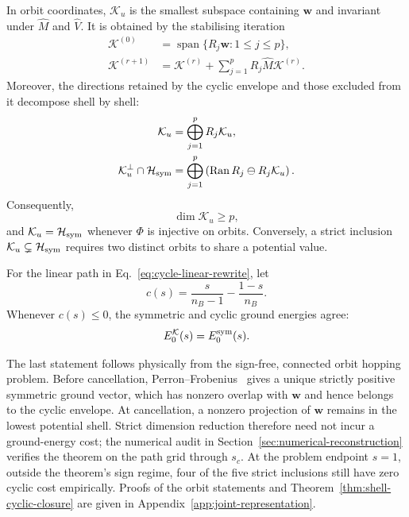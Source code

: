 \begin{theorem}
\label{thm:shell-cyclic-closure}
In orbit coordinates, $\mathcal K_u$ is the smallest subspace containing
$\boldsymbol w$ and invariant under $\widehat M$ and $\widehat V$.  It is obtained by
the stabilising iteration
\begin{align}
 \mathcal K^{(0)}&=\operatorname{span}\{R_j\boldsymbol w:1\leq j\leq p\},\\
 \mathcal K^{(r+1)}&=\mathcal K^{(r)}+
 \sum_{j=1}^pR_j\widehat M\mathcal K^{(r)}.
 \label{eq:shell-cyclic-iteration}
\end{align}
Moreover, the directions retained by the cyclic envelope and those excluded
from it decompose shell by shell:
\begin{align}
 \mathcal K_u&=\bigoplus_{j=1}^pR_j\mathcal K_u,\\
 \mathcal K_u^\perp\cap\mathcal H_{\rm sym}
 &=\bigoplus_{j=1}^p
 \left(\operatorname{Ran}R_j\ominus R_j\mathcal K_u\right).
 \label{eq:shell-complement-decomposition}
\end{align}
Consequently,
\begin{equation}
 \dim\mathcal K_u\geq p,
 \label{eq:shell-lower-bound}
\end{equation}
and $\mathcal K_u=\mathcal H_{\rm sym}$ whenever $\Phi$ is injective on
orbits.  Conversely, a strict inclusion
$\mathcal K_u\subsetneq\mathcal H_{\rm sym}$ requires two distinct orbits
to share a potential value.

For the linear path in Eq.~\eqref{eq:cycle-linear-rewrite}, let
\begin{equation}
 c(s)=\frac{s}{n_B-1}-\frac{1-s}{n_B}.
 \label{eq:hopping-coefficient}
\end{equation}
Whenever $c(s)\leq0$, the symmetric and cyclic ground energies agree:
\begin{equation}
 E_0^{\mathcal K}(s)=E_0^{\rm sym}(s).
 \label{eq:zero-cyclic-cost-before-cancellation}
\end{equation}
\end{theorem}

The last statement follows physically from the sign-free, connected orbit
hopping problem.  Before cancellation, Perron--Frobenius~\cite{HornJohnson2012}
gives a unique
strictly positive symmetric ground vector, which has nonzero overlap with
$\boldsymbol w$ and hence belongs to the cyclic envelope.  At cancellation, a
nonzero projection of $\boldsymbol w$ remains in the lowest potential shell.  Strict dimension
reduction therefore need not incur a ground-energy cost; the numerical
audit in Section~\ref{sec:numerical-reconstruction} verifies the theorem on
the path grid through $s_c$.  At the problem endpoint $s=1$, outside the
theorem's sign regime, four of the five strict inclusions still have zero
cyclic cost empirically.  Proofs of the orbit
statements and Theorem~\ref{thm:shell-cyclic-closure} are given in
Appendix~\ref{app:joint-representation}.
